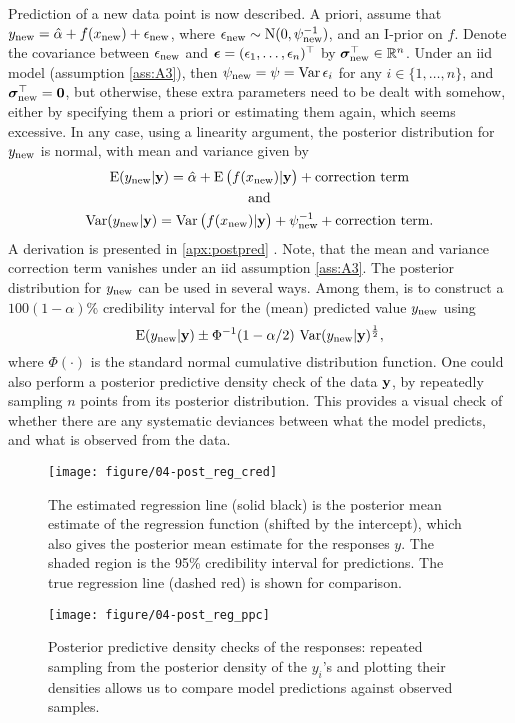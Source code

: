 Prediction of a new data point is now described.
A priori, assume that $y_{\text{new}} = \hat\alpha + f(x_{\text{new}}) + \epsilon_{\text{new}}$, where $\epsilon_{\text{new}} \sim \operatorname{N}(0,\psi^{-1}_{\text{new}})$, and an I-prior on $f$.
Denote the covariance between $\epsilon_{\text{new}}$ and ${\bm\epsilon} = (\epsilon_1,\dots,\epsilon_n)^\top$ by ${\bm\sigma}_{\text{new}}^\top \in \mathbb{R}^n$.
Under an iid model (assumption \ref{ass:A3}), then $\psi_{\text{new}} = \psi = \operatorname{Var} \epsilon_i$ for any $i\in\{1,\dots,n\}$, and ${\bm\sigma}_{\text{new}}^\top={\mathbf 0}$, but otherwise, these extra parameters need to be dealt with somehow, either by specifying them a priori or estimating them again, which seems excessive.
In any case, using a linearity argument, the posterior distribution for $y_{\text{new}}$ is normal, with mean and variance given by
\begin{gather}
  \operatorname{E}(y_{\text{new}}|{\mathbf y}) = \hat\alpha + \operatorname{E} \big( f(x_{\text{new}}) |{\mathbf y} \big) + \text{correction term} \\
  \text{and} \nonumber \\
  \operatorname{Var}(y_{\text{new}}|{\mathbf y}) 
  = \operatorname{Var}\big(f(x_{\text{new}})|{\mathbf y}\big) + \psi^{-1}_{\text{new}} + \text{correction term}.
\end{gather}
A derivation is presented in \cref{apx:postpred} .
Note, that the mean and variance correction term vanishes under an iid assumption \ref{ass:A3}.
The posterior distribution for $y_{\text{new}}$ can be used in several ways. 
Among them, is to construct a $100(1 - \alpha)\%$ credibility interval for the (mean) predicted value $y_{\text{new}}$ using
\[
  \operatorname{E}(y_{\text{new}}|{\mathbf y}) \pm \Phi^{-1}(1 - \alpha/2) \, \operatorname{Var}(y_{\text{new}}|{\mathbf y})^{\frac{1}{2}},
\]
where $\Phi(\cdot)$ is the standard normal cumulative distribution function.
One could also perform a posterior predictive density check of the data ${\mathbf y}$, by repeatedly sampling $n$ points from its posterior distribution.
This provides a visual check of whether there are any systematic deviances between what the model predicts, and what is observed from the data.

\begin{figure}[p]
  \centering
  \texttt{[image: figure/04-post\_reg\_cred]}
  \caption[Posterior regression and credibility intervals]{The estimated regression line (solid black) is the posterior mean estimate of the regression function (shifted by the intercept), which also gives the posterior mean estimate for the responses $y$. The shaded region is the 95\% credibility interval for predictions. The true regression line (dashed red) is shown for comparison.}
  \vspace{2em}
  \texttt{[image: figure/04-post\_reg\_ppc]}
  \caption[Posterior predictive density check]{Posterior predictive density checks of the responses: repeated sampling from the posterior density of the $y_i$'s and plotting their densities allows us to compare model predictions against observed samples.}
\end{figure}

